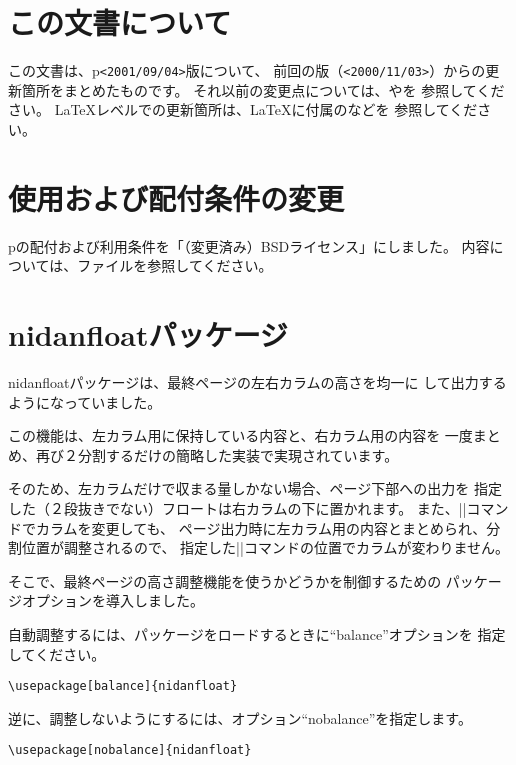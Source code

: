 \documentclass{plnews}
\author{中野 賢（\texttt{<ken-na at ascii.co.jp>}）
     \& 富樫 秀昭（\texttt{<hideak-t at ascii.co.jp>}）
}
\begin{document}
\maketitle

\section{この文書について}
この文書は、p\LaTeXe{}\texttt{<2001/09/04>}版について、
前回の版（\texttt{<2000/11/03>}）からの更新箇所をまとめたものです。
それ以前の変更点については、やを
参照してください。
\LaTeX{}レベルでの更新箇所は、\LaTeX{}に付属のなどを
参照してください。


\section{使用および配付条件の変更}
p\LaTeXe{}の配付および利用条件を「（変更済み）BSDライセンス」にしました。
内容については、ファイルを参照してください。


\section{nidanfloatパッケージ}
nidanfloatパッケージは、最終ページの左右カラムの高さを均一に
して出力するようになっていました。

この機能は、左カラム用に保持している内容と、右カラム用の内容を
一度まとめ、再び２分割するだけの簡略した実装で実現されています。

そのため、左カラムだけで収まる量しかない場合、ページ下部への出力を
指定した（２段抜きでない）フロートは右カラムの下に置かれます。
また、|\newpage|コマンドでカラムを変更しても、
ページ出力時に左カラム用の内容とまとめられ、分割位置が調整されるので、
指定した|\newpage|コマンドの位置でカラムが変わりません。

そこで、最終ページの高さ調整機能を使うかどうかを制御するための
パッケージオプションを導入しました。

自動調整するには、パッケージをロードするときに``balance''オプションを
指定してください。
\begin{verbatim}
\usepackage[balance]{nidanfloat}
\end{verbatim}

逆に、調整しないようにするには、オプション``nobalance''を指定します。
\begin{verbatim}
\usepackage[nobalance]{nidanfloat}
\end{verbatim}
\end{document}
